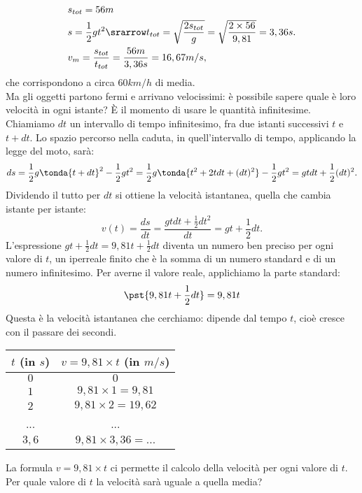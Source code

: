 \begin{align*}
 & s_{tot} = 56m\\
 & s =\frac{1}{2}gt^2 \srarrow t_{tot}= \sqrt{\frac{2s_{tot}}{g}}=
 \sqrt{\frac{2\times 56}{9,81}}=3,36 s.\\
 & v_m= \frac{s_{tot}}{t_{tot}}=\frac{56 m}{3,36 s}=16,67 m/s,
\end{align*}
che corrispondono a circa \(60 km/h\) di media.\\
Ma gli oggetti partono fermi e arrivano velocissimi: 
è possibile sapere quale è loro velocità in ogni istante? È il momento
di usare le quantità infinitesime.\\
Chiamiamo $dt$ un intervallo di tempo infinitesimo, fra due istanti successivi
$t$ e $t+dt$.
Lo spazio percorso nella caduta, in quell'intervallo di tempo, applicando 
la legge del moto, sarà:
\[
 ds=\frac{1}{2}g\tonda{t+dt}^2-\frac{1}{2}gt^2=
 \frac{1}{2}g\tonda{t^2+2tdt+(dt)^2}-\frac{1}{2}gt^2=
 gtdt+\frac{1}{2}(dt)^2. 
\]
Dividendo il tutto per \(dt\) si ottiene la velocità istantanea, quella che 
cambia istante per istante:
\[
 v(t)=\frac{ds}{dt}=\frac{gtdt+\frac{1}{2}dt^2}{dt}=gt+\frac{1}{2}dt.
\]
L'espressione $gt+\frac{1}{2}dt=9,81t+\frac{1}{2}dt$ diventa un numero ben
preciso per ogni valore di $t$, un iperreale finito che è la
somma di un numero standard e di un numero infinitesimo. 
Per averne il valore reale, applichiamo la parte standard:
\[
 \pst{9,81t+\frac{1}{2}dt}=9,81t
\]
Questa è la velocità istantanea che cerchiamo: dipende dal tempo $t$,
cioè cresce con il passare dei secondi. 

\begin{center}
\begin{tabular}{cc}\toprule
$t$ (in $s$) & $v=9,81\times t$ (in $m/s$) \\\midrule
$0$ & $0$  \\
$1$ & $9,81\times 1 =9,81$ \\
$2$ & $9,81\times 2 =19,62$ \\
... & ... \\
$3,6$ & $9,81\times 3,36= ...$\\\bottomrule
\end{tabular}
\label{tab:diff_velocita}
\end{center}

La formula $v=9,81\times t$ ci permette il calcolo della velocità per ogni 
valore di $t$.
Per quale valore di \(t\) la velocità sarà uguale a quella media? 


